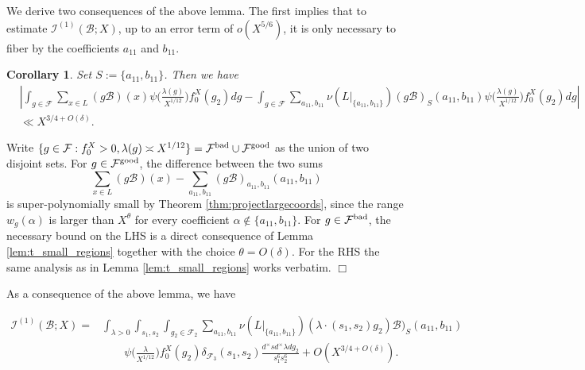 \documentclass{article}
\def\bad{{\rm bad}}
\def\good{{\rm good}}
\def\cB{{\mathcal B}}
\def\FF{{\mathcal F}}
\def\I{{\mathcal I}}
\newtheorem{corollary}[theorem]{Corollary}
\newenvironment{proof}{\noindent {\bf Proof:}}{$\Box$ \vspace{2 ex}}
\begin{document}
We derive two consequences of the above lemma. The first implies that to estimate $\I^{(1)}(\cB;X)$, up to an error term of $o(X^{5/6})$, it is only necessary to fiber by the coefficients $a_{11}$ and $b_{11}$.

\begin{corollary}
Set $S:=\{a_{11},b_{11}\}$. Then we have
\begin{equation*}
\begin{array}{ll}
&\displaystyle
\left |\int_{g\in\FF}\sum_{x\in L} (g\cB)(x)\psi\Big(\frac{\lambda(g)}{X^{1/12}}\Big)f_0^X(g_2)dg
-\int_{g\in\FF}\sum_{a_{11},b_{11}}\nu(L|_{\{a_{11},b_{11}\}})(g\cB)_S(a_{11},b_{11})\psi\Big(\frac{\lambda(g)}{X^{1/12}}\Big)f_0^X(g_2)dg\right |
\\[.2in]
&\ll  X^{3/4+O(\delta)}.
\end{array}
\end{equation*}
\end{corollary}
\begin{proof}
Write $\{g\in \FF:f_0^X>0,\lambda(g)\asymp X^{1/12}\}=\FF^\bad\cup\FF^\good$ as the union of two disjoint sets.
For $g\in\FF^\good$, the difference between the two sums
\begin{equation*}
\sum_{x\in L}(g\cB)(x)
-\sum_{a_{11},b_{11}}(g\cB)_{a_{11},b_{11}}(a_{11},b_{11})
\end{equation*}
is super-polynomially small by Theorem \ref{thm:projectlargecoords}, since the range $w_g(\alpha)$ is larger than $X^\theta$ for every coefficient $\alpha\not\in\{a_{11},b_{11}\}$.
For $g\in\FF^\bad$, the necessary bound on the LHS is a direct consequence of Lemma \ref{lem:t_small_regions} together with the choice $\theta=O(\delta)$. For the RHS the same analysis as in  Lemma \ref{lem:t_small_regions} works verbatim. 
\end{proof}

As a consequence of the above lemma, we have

\begin{equation}\label{eq:cor_t_small_1}
\begin{array}{ll}
\I^{(1)}(\cB;X)=&\displaystyle
\int_{\lambda>0}\int_{s_1,s_2}\int_{g_2\in\FF_2}\sum_{a_{11},b_{11}}\nu(L|_{\{a_{11},b_{11}\}})(\lambda\cdot (s_1,s_2)g_2)\cB)_S(a_{11},b_{11})
\\[.2in]
&\displaystyle\quad\quad \psi\Big(\frac{\lambda}{X^{1/12}}\Big)f_0^X(g_2)\delta_{\FF_3}(s_1,s_2)\frac{d^\times sd^\times\lambda dg_2}{s_1^6s_2^6} + O(X^{3/4 + O(\delta)}).
\end{array}
\end{equation}
\end{document}
